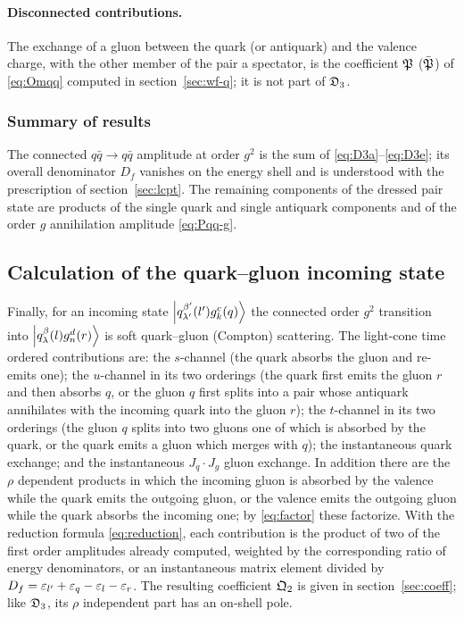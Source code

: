 \paragraph{Disconnected contributions.} The exchange of a gluon between the quark (or antiquark)
and the valence charge, with the other member of the pair a spectator, is the coefficient
$\mathfrak{P}$ ($\bar{\mathfrak{P}}$) of \eqref{eq:Omqq} computed in section~\ref{sec:wf-q}; it is not part of
$\mathfrak{D}_{3}$.

\subsubsection{Summary of results}
\label{sec:sum-qq}

The connected $q\bar q\to q\bar q$ amplitude at order $g^{2}$ is the sum of \eqref{eq:D3a}--\eqref{eq:D3e};
its overall denominator $D_{f}$ vanishes on the energy shell and is understood with the
prescription of section~\ref{sec:lcpt}. The remaining components of the dressed pair state are
products of the single quark and single antiquark components and of the order $g$ annihilation
amplitude \eqref{eq:Pqq-g}.

\subsection{Calculation of the quark--gluon incoming state}
\label{sec:wf-qg}

Finally, for an incoming state $\left|q^{\beta'}_{\lambda'}(l')g^{c}_{k}(q)\right\rangle$ the connected order
$g^{2}$ transition into $\left|q^{\beta}_{\lambda}(l)g^{d}_{n}(r)\right\rangle$ is soft quark--gluon (Compton)
scattering. The light-cone time ordered contributions are: the $s$-channel (the quark absorbs
the gluon and re-emits one); the $u$-channel in its two orderings (the quark first emits the
gluon $r$ and then absorbs $q$, or the gluon $q$ first splits into a pair whose antiquark
annihilates with the incoming quark into the gluon $r$); the $t$-channel in its two orderings (the
gluon $q$ splits into two gluons one of which is absorbed by the quark, or the quark emits a gluon
which merges with $q$); the instantaneous quark exchange; and the instantaneous $J_{q}\cdot J_{g}$
gluon exchange. In addition there are the $\rho$ dependent products in which the incoming gluon is
absorbed by the valence while the quark emits the outgoing gluon, or the valence emits the outgoing
gluon while the quark absorbs the incoming one; by \eqref{eq:factor} these factorize. With the
reduction formula \eqref{eq:reduction}, each contribution is the product of two of the first order
amplitudes already computed, weighted by the corresponding ratio of energy denominators, or an
instantaneous matrix element divided by $D_{f}=\varepsilon_{l'}+\varepsilon_{q}-\varepsilon_{l}-\varepsilon_{r}$. The resulting
coefficient $\mathfrak{Q}_{2}$ is given in section~\ref{sec:coeff}; like $\mathfrak{D}_{3}$, its $\rho$
independent part has an on-shell pole.
